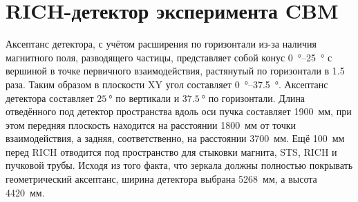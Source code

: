 \section{RICH-детектор эксперимента CBM}\label{sec:secCBMrich}
















Аксептанс детектора, с учётом расширения по горизонтали из-за наличия магнитного поля, разводящего частицы, представляет собой конус \SI{0}{\degree}--\SI{25}{\degree} с вершиной в точке первичного взаимодействия, растянутый по горизонтали в 1.5 раза. Таким образом в плоскости XY угол составляет \SI{0}{\degree}--\SI{37.5}{\degree}.
Аксептанс детектора составляет $\SI{25}{\degree}$ по вертикали и $\SI{37.5}{\degree}$ по горизонтали. Длина отведённого под детектор пространства вдоль оси пучка составляет 1900~мм, при этом передняя плоскость находится на расстоянии 1800~мм от точки взаимодействия, а задняя, соответственно, на расстоянии 3700~мм. Ещё 100~мм перед RICH отводится под пространство для стыковки магнита, STS, RICH и пучковой трубы. Исходя из того факта, что зеркала должны полностью покрывать геометрический аксептанс, ширина детектора выбрана 5268~мм, а высота 4420~мм.


